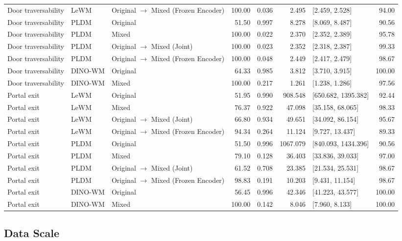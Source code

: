 \begin{longtable}{@{}p{1.8cm}lp{3.65cm}rrrp{2.5cm}r@{}}
Door traversability & LeWM & Original $\rightarrow$ Mixed (Frozen Encoder) & 100.00 & 0.036 & 2.495 & [2.459, 2.528] & 94.00 \\
Door traversability & PLDM & Original & 51.50 & 0.997 & 8.278 & [8.069, 8.487] & 90.56 \\
Door traversability & PLDM & Mixed & 100.00 & 0.022 & 2.370 & [2.352, 2.389] & 95.78 \\
Door traversability & PLDM & Original $\rightarrow$ Mixed (Joint) & 100.00 & 0.023 & 2.352 & [2.318, 2.387] & 99.33 \\
Door traversability & PLDM & Original $\rightarrow$ Mixed (Frozen Encoder) & 100.00 & 0.048 & 2.449 & [2.417, 2.479] & 98.67 \\
Door traversability & DINO-WM & Original & 64.33 & 0.985 & 3.812 & [3.710, 3.915] & 100.00 \\
Door traversability & DINO-WM & Mixed & 100.00 & 0.217 & 1.261 & [1.238, 1.286] & 97.56 \\
\midrule
Portal exit & LeWM & Original & 51.95 & 0.990 & 908.548 & [650.682, 1395.382] & 92.44 \\
Portal exit & LeWM & Mixed & 76.37 & 0.922 & 47.098 & [35.158, 68.065] & 98.33 \\
Portal exit & LeWM & Original $\rightarrow$ Mixed (Joint) & 66.80 & 0.934 & 49.651 & [34.092, 86.154] & 95.67 \\
Portal exit & LeWM & Original $\rightarrow$ Mixed (Frozen Encoder) & 94.34 & 0.264 & 11.124 & [9.727, 13.437] & 89.33 \\
Portal exit & PLDM & Original & 51.50 & 0.996 & 1067.079 & [840.093, 1434.396] & 90.56 \\
Portal exit & PLDM & Mixed & 79.10 & 0.128 & 36.403 & [33.836, 39.033] & 97.00 \\
Portal exit & PLDM & Original $\rightarrow$ Mixed (Joint) & 61.52 & 0.708 & 23.385 & [21.534, 25.531] & 98.67 \\
Portal exit & PLDM & Original $\rightarrow$ Mixed (Frozen Encoder) & 98.83 & 0.191 & 10.203 & [9.431, 11.154] & 98.67 \\
Portal exit & DINO-WM & Original & 56.45 & 0.996 & 42.346 & [41.223, 43.577] & 100.00 \\
Portal exit & DINO-WM & Mixed & 100.00 & 0.142 & 8.046 & [7.960, 8.133] & 100.00 \\
\end{longtable}\endgroup
\subsection{Data Scale}
\label{app:data-scale}

